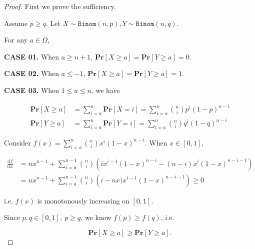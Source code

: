 \documentclass{article}
\begin{document}
\begin{proof}
First we prove the sufficiency.

\hspace{1.3em}
Assume $p\geq q$. Let $X\sim\mathtt{Binom}(n,p), Y\sim\mathtt{Binom}(n,q).$ 

\hspace{1.3em}
For any $a\in\Omega$,

\hspace{1.3em}
\textbf{CASE 01.} When $a\geq n+1$, $\mathbf{Pr}\left[X\geq a\right]=\mathbf{Pr}\left[Y\geq a\right]=0.$

\hspace{1.3em}
\textbf{CASE 02.} When $a\le -1$, $\mathbf{Pr}\left[X\geq a\right]=\mathbf{Pr}\left[Y\geq a\right]=1.$

\hspace{1.3em}
\textbf{CASE 03.} When $1\le a\le n$, we have

\vspace{-2.5em}
\begin{align*}
   \mathbf{Pr}\left[X\geq a\right] &= \sum_{i=a}^{n}\mathbf{Pr}\left[X=i\right] = \sum_{i=a}^n\binom{n}{i}p^i(1-p)^{n-i}
   \\
   \mathbf{Pr}\left[Y\geq a\right] &= \sum_{i=a}^{n}\mathbf{Pr}\left[Y=i\right] = \sum_{i=a}^n\binom{n}{i}q^i(1-q)^{n-i}
\end{align*}

\vspace{-1em} \hspace{1.3em}
Consider $f(x)=\sum_{i=a}^{n}\binom{n}{i}x^i(1-x)^{n-i}.$ When $x\in[0,1],$

\vspace{-2.25em}
\begin{align*}
    \frac{\mathrm{d}f}{\mathrm{d}x} &= nx^{n-1}+\sum_{i=a}^{n-1} \binom{n}{i}\left(ix^{i-1}(1-x)^{n-i}-(n-i)x^i(1-x)^{n-i-1}\right) \\
    &= nx^{n-1}+\sum_{i=a}^{n-1}\binom{n}{i}\left(i-nx)x^{i-1}(1-x)^{n-i-1}\right) \geq 0
\end{align*}

\vspace{-1em} \hspace{6em}
i.e. $f(x)$ is monotonously increasing on $[0,1].$ 

\vspace{0.3em} \hspace{1.3em}
Since $p,q\in[0,1],\ p\geq q$, we know $f(p)\geq f(q)$, i.e. 

\vspace{-1.5em}
$$\mathbf{Pr}\left[X\geq a\right]\geq\mathbf{Pr}\left[Y\geq a\right].$$


\end{proof}
\end{document}
